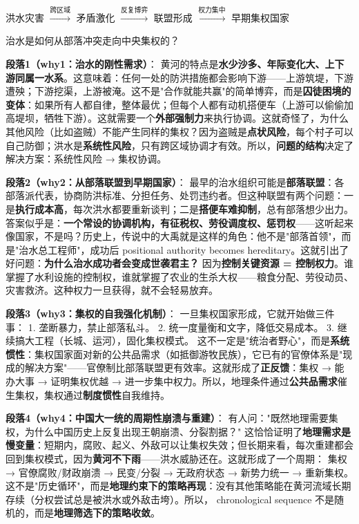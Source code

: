 \documentclass[../main.tex]{subfiles}
\begin{document}
	\begin{logicmap}
		洪水灾害 $\xrightarrow{\text{跨区域}}$ 矛盾激化 $\xrightarrow{\text{反复博弈}}$ 联盟形成 $\xrightarrow{\text{权力集中}}$ 早期集权国家
	\end{logicmap}
	
	\begin{questionbox}
		治水是如何从部落冲突走向中央集权的？
	\end{questionbox}
	
	\textbf{段落1（why1：治水的刚性需求）}：  
	黄河的特点是\textbf{水少沙多、年际变化大、上下游同属一水系}。这意味着：任何一处的防洪措施都会影响下游——上游筑堤，下游遭殃；下游挖渠，上游被淹。这不是"合作就能共赢"的简单博弈，而是\textbf{囚徒困境的变体}：如果所有人都自律，整体最优；但每个人都有动机搭便车（上游可以偷偷加高堤坝，牺牲下游）。这就需要一个\textbf{外部强制力}来执行协调。这就奇怪了，为什么其他风险（比如盗贼）不能产生同样的集权？因为盗贼是\textbf{点状风险}，每个村子可以自己防御；洪水是\textbf{系统性风险}，只有跨区域协调才有效。所以，\textbf{问题的结构}决定了解决方案：系统性风险 → 集权协调。
	
	\textbf{段落2（why2：从部落联盟到早期国家）}：  
	最早的治水组织可能是\textbf{部落联盟}：各部落派代表，协商防洪标准、分担任务、处罚违约者。但这种联盟有两个问题：一是\textbf{执行成本高}，每次洪水都要重新谈判；二是\textbf{搭便车难抑制}，总有部落想少出力。答案似乎是：\textbf{一个常设的协调机构，有征税权、劳役调度权、惩罚权}——这听起来像国家，不是吗？历史上，传说中的大禹就是这样的角色：他不是"部落首领"，而是"治水总工程师"，成功后 positional authority becomes hereditary。这就引出了好问题：\textbf{为什么治水成功者会变成世袭君主？} 因为\textbf{控制关键资源 = 控制权力}。谁掌握了水利设施的控制权，谁就掌握了农业的生杀大权——粮食分配、劳役动员、灾害救济。这种权力一旦获得，就不会轻易放弃。
	
	\textbf{段落3（why3：集权的自我强化机制）}：  
	一旦集权国家形成，它就开始做三件事：  
    1. 垄断暴力，禁止部落私斗。  
    2. 统一度量衡和文字，降低交易成本。  
    3. 继续搞大工程（长城、运河），固化集权模式。  
    这不一定是"统治者野心"，而是\textbf{系统惯性}：集权国家面对新的公共品需求（如抵御游牧民族），它已有的官僚体系是"现成的解决方案"——官僚制比部落联盟更有效率。这就形成了\textbf{正反馈}：集权 → 能办大事 → 证明集权优越 → 进一步集中权力。所以，地理条件通过\textbf{公共品需求}催生集权，集权通过\textbf{制度惯性}自我维持。
	
	\textbf{段落4（why4：中国大一统的周期性崩溃与重建）}：  
	有人问："既然地理需要集权，为什么中国历史上反复出现王朝崩溃、分裂割据？" 这恰恰证明了\textbf{地理需求是慢变量}：短期内，腐败、起义、外敌可以让集权失效；但长期来看，每次重建都会回到集权模式，因为\textbf{黄河不下雨}——洪水威胁还在。这就形成了一个周期：  
    集权 → 官僚腐败/财政崩溃 → 民变/分裂 → 无政府状态 → 新势力统一 → 重新集权。  
    这不是"历史循环"，而是\textbf{地理约束下的策略再现}：没有其他策略能在黄河流域长期存续（分权尝试总是被洪水或外敌击垮）。所以， chronological sequence 不是随机的，而是\textbf{地理筛选下的策略收敛}。
	
\end{document}
